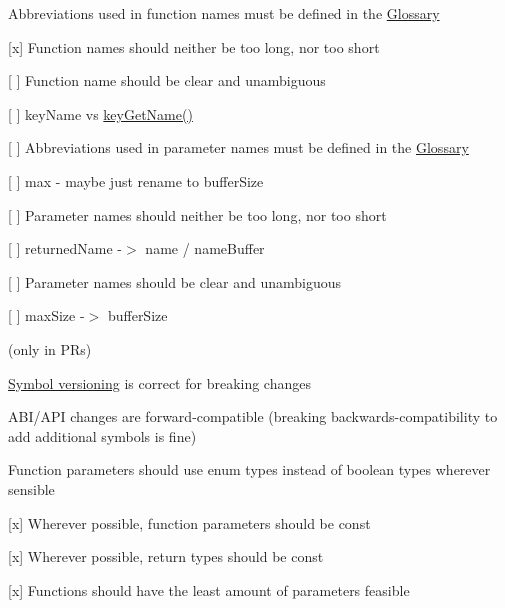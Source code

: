 \begin{DoxyItemize}
\item Abbreviations used in function names must be defined in the \hyperlink{doc_help_elektra-glossary_md}{Glossary}
\item \mbox{[}x\mbox{]} Function names should neither be too long, nor too short
\item \mbox{[} \mbox{]} Function name should be clear and unambiguous
\begin{DoxyItemize}
\item \mbox{[} \mbox{]} {\ttfamily key\+Name} vs {\ttfamily \hyperlink{group__keyname_gab29a850168d9b31c9529e90cf9ab68be}{key\+Get\+Name()}}
\end{DoxyItemize}
\item \mbox{[} \mbox{]} Abbreviations used in parameter names must be defined in the \hyperlink{doc_help_elektra-glossary_md}{Glossary}
\begin{DoxyItemize}
\item \mbox{[} \mbox{]} max -\/ maybe just rename to {\ttfamily buffer\+Size}
\end{DoxyItemize}
\item \mbox{[} \mbox{]} Parameter names should neither be too long, nor too short
\begin{DoxyItemize}
\item \mbox{[} \mbox{]} {\ttfamily returned\+Name} -\/$>$ {\ttfamily name} / {\ttfamily name\+Buffer}
\end{DoxyItemize}
\item \mbox{[} \mbox{]} Parameter names should be clear and unambiguous
\begin{DoxyItemize}
\item \mbox{[} \mbox{]} {\ttfamily max\+Size} -\/$>$ {\ttfamily buffer\+Size}
\end{DoxyItemize}
\end{DoxyItemize}

(only in P\+Rs)


\begin{DoxyItemize}
\item \hyperlink{doc_dev_symbol-versioning_md}{Symbol versioning} is correct for breaking changes
\item A\+B\+I/\+A\+PI changes are forward-\/compatible (breaking backwards-\/compatibility to add additional symbols is fine)
\end{DoxyItemize}


\begin{DoxyItemize}
\item Function parameters should use enum types instead of boolean types wherever sensible
\item \mbox{[}x\mbox{]} Wherever possible, function parameters should be {\ttfamily const}
\item \mbox{[}x\mbox{]} Wherever possible, return types should be {\ttfamily const}
\item \mbox{[}x\mbox{]} Functions should have the least amount of parameters feasible
\end{DoxyItemize}


